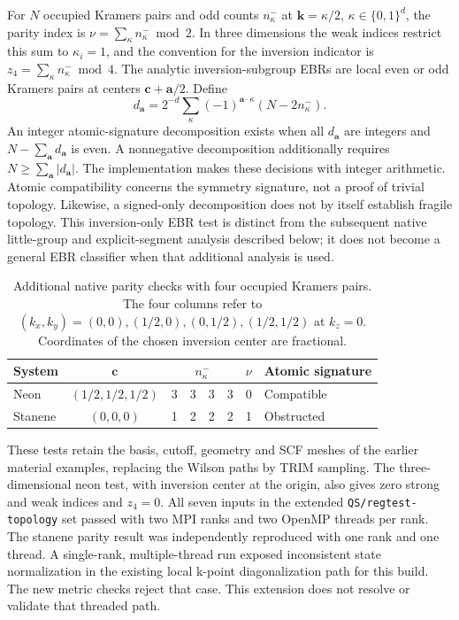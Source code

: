 \documentclass[11pt]{article}
\begin{document}
For $N$ occupied Kramers pairs and odd counts $n^-_\kappa$ at
$\mathbf k=\kappa/2$, $\kappa\in\{0,1\}^d$, the parity index is
$\nu=\sum_\kappa n^-_\kappa\bmod2$. In three dimensions the weak indices
restrict this sum to $\kappa_i=1$, and the convention for the inversion
indicator is $z_4=\sum_\kappa n^-_\kappa\bmod4$.
The analytic inversion-subgroup EBRs are local even or odd Kramers pairs
at centers $\mathbf c+\mathbf a/2$. Define
\begin{equation}
 d_{\mathbf a}=2^{-d}\sum_\kappa(-1)^{\mathbf a\cdot\kappa}
                     (N-2n^-_\kappa).
\end{equation}
An integer atomic-signature decomposition exists when all
$d_{\mathbf a}$ are integers and $N-\sum_{\mathbf a}d_{\mathbf a}$ is even.
A nonnegative decomposition additionally requires
$N\geq\sum_{\mathbf a}|d_{\mathbf a}|$. The implementation makes these
decisions with integer arithmetic. Atomic compatibility concerns the
symmetry signature, not a proof of trivial topology. Likewise, a
signed-only decomposition does not by itself establish fragile topology.
This inversion-only EBR test is distinct from the subsequent native
little-group and explicit-segment analysis described below; it does
not become a general EBR classifier when that additional analysis is used.

\begin{table}[htbp]
\centering
\small
\caption{Additional native parity checks with four occupied Kramers pairs.
The four columns refer to $(k_x,k_y)=(0,0),(1/2,0),(0,1/2),(1/2,1/2)$
at $k_z=0$. Coordinates of the chosen inversion center are fractional.}
\label{tab:inversion-checks}
\begin{tabular}{lccccccl}
\toprule
System & $\mathbf c$ & \multicolumn{4}{c}{$n^-_\kappa$} & $\nu$ & Atomic signature\\
\midrule
Neon & $(1/2,1/2,1/2)$ & 3 & 3 & 3 & 3 & 0 & Compatible\\
Stanene & $(0,0,0)$ & 1 & 2 & 2 & 2 & 1 & Obstructed\\
\bottomrule
\end{tabular}
\end{table}

These tests retain the basis, cutoff, geometry and SCF meshes of the
earlier material examples, replacing the Wilson paths by TRIM sampling.
The three-dimensional neon test, with inversion center at the origin,
also gives zero strong and weak indices and $z_4=0$. All seven inputs
in the extended \texttt{QS/regtest-topology} set passed with two MPI
ranks and two OpenMP threads per rank. The stanene parity result was
independently reproduced with one rank and one thread. A single-rank,
multiple-thread run exposed inconsistent state normalization in the
existing local k-point diagonalization path for this build. The new
metric checks reject that case. This extension does not resolve or
validate that threaded path.
\end{document}
